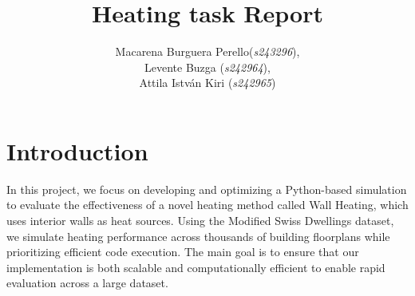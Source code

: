 \documentclass[a4paper,12pt]{article}
\title{Heating task Report}
\author{Macarena Burguera Perello(\textit{s243296}), \\
        Levente Buzga (\textit{s242964}), \\
        Attila István Kiri (\textit{s242965})}
\begin{document}
\maketitle


\section{Introduction}

In this project, we focus on developing and optimizing a Python-based simulation to evaluate the effectiveness of a novel heating method called Wall Heating, which uses interior walls as heat sources. Using the Modified Swiss Dwellings dataset, we simulate heating performance across thousands of building floorplans while prioritizing efficient code execution. The main goal is to ensure that our implementation is both scalable and computationally efficient to enable rapid evaluation across a large dataset.
\end{document}
